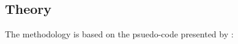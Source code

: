 \subsection{Theory}
\label{sec:theory}
The methodology is based on the psuedo-code presented by \parencite{cramer88}:


